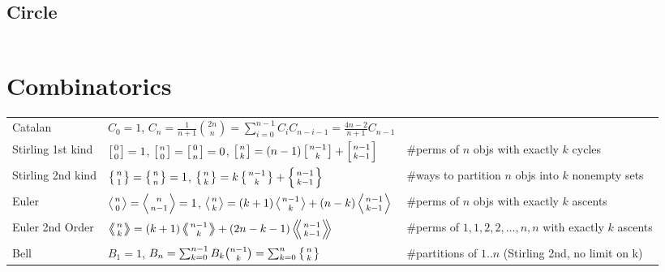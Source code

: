 \documentclass[8pt,a4paper,landscape,oneside]{amsart}
\newcommand{\code}[1]{\inputminted[fontsize=\normalsize,baselinestretch=1,breaklines,tabsize=2]{cpp}{code/#1}}
\begin{document}
\begin{multicols*}{3}
\subsection{Circle}
\code{geometry/CP/circles.cpp}

\section{Combinatorics}
\begin{tabular}{@{}l|l|l@{}}
    \toprule
    Catalan	&	$C_0=1$, $C_n=\frac{1}{n+1}\binom{2n}{n} = \sum_{i=0}^{n-1}C_iC_{n-i-1} = \frac{4n-2}{n+1}C_{n-1}$  & \\
    Stirling 1st kind & $\left[{0\atop 0}\right]=1$, $\left[{n\atop 0}\right]=\left[{0\atop n}\right]=0$, $\left[{n\atop k}\right]=(n-1)\left[{n-1\atop k}\right]+\left[{n-1\atop k-1}\right]$ & \#perms of $n$ objs with exactly $k$ cycles\\
    Stirling 2nd kind & $\left\{{n\atop 1}\right\}=\left\{{n\atop n}\right\}=1$, $\left\{{n\atop k}\right\} = k \left\{{ n-1 \atop k }\right\} + \left\{{n-1\atop k-1}\right\}$ & \#ways to partition $n$ objs into $k$ nonempty sets\\
    Euler	& $\left \langle {n\atop 0} \right \rangle = \left \langle {n\atop n-1} \right \rangle = 1 $, $\left \langle {n\atop k} \right \rangle = (k+1) \left \langle {n-1\atop {k}} \right \rangle + (n-k)\left \langle {{n-1}\atop {k-1}} \right \rangle$ & \#perms of $n$ objs with exactly $k$ ascents \\
    Euler 2nd Order &  $\left \langle \!\!\left \langle {n\atop k} \right \rangle \!\! \right \rangle = (k+1) \left \langle \!\! \left \langle {{n-1}\atop {k}} \right \rangle \!\! \right \rangle +(2n-k-1)\left \langle \!\! \left \langle {{n-1}\atop {k-1}} \right \rangle  \!\! \right \rangle$ & \#perms of ${1,1,2,2,...,n,n}$ with exactly $k$ ascents \\
    Bell & $B_1 = 1$, $B_n = \sum_{k=0}^{n-1} B_k \binom{n-1}{k} = \sum_{k=0}^n\left\{{n\atop k}\right\}$ & \#partitions of $1..n$ (Stirling 2nd, no limit on k)\\
    \bottomrule
    \end{tabular}


\end{multicols*}
\end{document}
